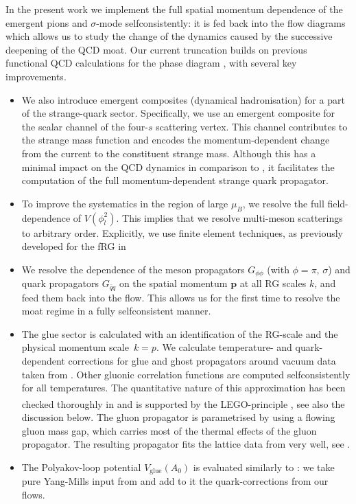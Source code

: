 \documentclass[10pt,prd,superscriptaddress,twocolumn]{revtex4-2}
\newcommand{\LEGO}{LEGO\textsuperscript{\textregistered}}
\begin{document}
In the present work we implement the full spatial momentum dependence of the emergent pions and $\sigma$-mode selfconsistently: it is fed back into the flow diagrams which allows us to study the change of the dynamics caused by the successive deepening of the QCD moat.  
Our current truncation builds on previous functional QCD calculations for the phase diagram \cite{Fu:2019hdw, Ihssen:2024miv}, with several key improvements. 
%
\begin{itemize}
	\item We also introduce emergent composites (dynamical hadronisation) for a part of the strange-quark sector. Specifically, we use an emergent composite for the scalar channel of the four-$s$ scattering vertex. This channel contributes to the strange mass function and encodes the momentum-dependent change from the current to the constituent strange mass. Although this has a minimal impact on the QCD dynamics in comparison to \cite{Fu:2019hdw, Ihssen:2024miv, WZHWYF2026}, it facilitates the computation of the full momentum-dependent strange quark propagator.
	\item To improve the systematics in the region of large $\mu_B$, we resolve the full field-dependence of $V(\phi_l^2)$. This implies that we resolve multi-meson scatterings to arbitrary order. Explicitly, we use finite element techniques, as previously developed for the fRG in \cite{Grossi:2019urj, Grossi:2021ksl, Ihssen:2022xkr, Ihssen:2023qaq, Ihssen:2023xlp, Ihssen:2024miv}
	\item We resolve the dependence of the meson propagators $G_{\phi\phi}$ (with $\phi=\pi,\,\sigma$) and quark propagators $G_{\bar{q}q}$ on the spatial momentum $\boldsymbol{p}$ at all RG scales $k$, and feed them back into the flow. This allows us for the first time to resolve the moat regime in a fully selfconsistent manner.
	\item The glue sector is calculated with an identification of the RG-scale and the physical momentum scale~${k=p}$. We calculate temperature- and quark-dependent corrections for glue and ghost propagators around vacuum data taken from \cite{Cyrol:2017ewj}. Other gluonic correlation functions are computed selfconsistently for all  temperatures. The quantitative nature of this approximation has been checked thoroughly in \cite{Fu:2019hdw, Ihssen:2024miv} and is supported by the \LEGO-principle \cite{Ihssen:2024miv}, see also the discussion below. 
    The gluon propagator is parametrised by using a flowing gluon mass gap, which carries most of the thermal effects of the gluon propagator. The resulting propagator fits the lattice data from \cite{Ilgenfritz:2017kkp} very well, see . 
	\item The Polyakov-loop potential $V_\textrm{glue}(A_0)$ is evaluated similarly to \cite{Fu:2019hdw}: we take pure Yang-Mills input from \cite{Lo:2013hla} and add to it the quark-corrections from our flows.
\end{itemize}
\end{document}
